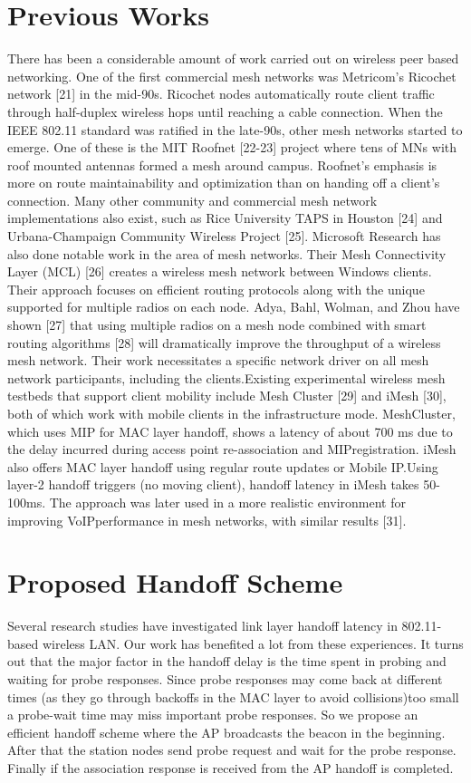 \documentclass[12pt,a4paper]{report}
\begin{document}
\section{Previous Works}
There has been a considerable amount of work carried out on wireless peer based networking. One of the first commercial mesh networks was Metricom’s Ricochet network [21] in the mid-90s. Ricochet nodes automatically route client traffic through half-duplex wireless hops until reaching a cable connection. When the IEEE 802.11 standard was ratified in the late-90s, other mesh networks started to emerge. One of these is the MIT Roofnet [22-23] project where tens of MNs with roof mounted antennas formed a mesh around campus. Roofnet’s emphasis is more on route maintainability and optimization than on handing off a client’s connection. Many other community and commercial mesh network implementations also exist, such as Rice University TAPS in Houston [24] and Urbana-Champaign Community Wireless Project [25]. Microsoft Research has also done notable work in the area of mesh networks. Their Mesh Connectivity Layer (MCL) [26] creates a wireless mesh network between Windows clients. Their approach focuses on efficient routing protocols along with the unique supported for multiple radios on each node. Adya, Bahl, Wolman, and Zhou have shown [27] that using multiple radios on a mesh node combined with smart routing algorithms [28] will dramatically improve the throughput of a wireless mesh network. Their work necessitates a specific network driver on all mesh network participants, including the clients.Existing experimental wireless mesh testbeds that support client mobility include Mesh Cluster [29] and iMesh [30], both of which work with mobile clients in the infrastructure mode. MeshCluster, which uses MIP for MAC layer handoff, shows a latency of about 700 ms due to the delay incurred during access point re-association and MIPregistration. iMesh also offers MAC layer handoff using regular route updates or Mobile IP.Using layer-2 handoff triggers (no moving client), handoff latency in iMesh takes 50-100ms. The approach was later used in a more realistic environment for improving VoIPperformance in mesh networks, with similar results [31]. 

\section{Proposed Handoff Scheme}
Several research studies have investigated link layer handoff latency in 802.11-based wireless LAN. Our work has benefited a lot from these experiences. It turns out that the major factor in the handoff delay is the time spent in probing and waiting for probe responses. Since probe responses may come back at different times (as they go through backoffs in the MAC layer to avoid collisions)too small a probe-wait time may miss important probe responses. So we propose an efficient handoff scheme where the AP broadcasts the beacon in the beginning. After that the station nodes send probe request and wait for the probe response. Finally if the association response is received from the AP handoff is completed.
\end{document}
